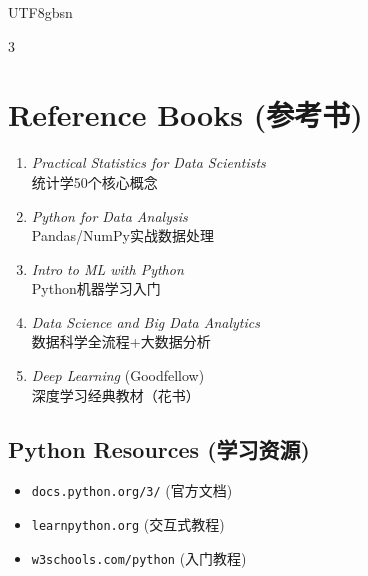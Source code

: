 \documentclass[10pt,landscape,a4paper]{article}
\newcommand{\zhint}[1]{{\scriptsize\color{gray!70!black}#1}}
\begin{document}
\begin{CJK}{UTF8}{gbsn}
\begin{multicols}{3}
\section{Reference Books \zhint{(参考书)}}

\begin{enumerate}[leftmargin=*, nosep, itemsep=2pt]
    \item \textit{Practical Statistics for Data Scientists}\\
    \zhint{统计学50个核心概念}
    \item \textit{Python for Data Analysis}\\
    \zhint{Pandas/NumPy实战数据处理}
    \item \textit{Intro to ML with Python}\\
    \zhint{Python机器学习入门}
    \item \textit{Data Science and Big Data Analytics}\\
    \zhint{数据科学全流程+大数据分析}
    \item \textit{Deep Learning} (Goodfellow)\\
    \zhint{深度学习经典教材（花书）}
\end{enumerate}

\subsection{Python Resources \zhint{(学习资源)}}
\begin{itemize}[leftmargin=*, nosep, itemsep=0pt]
    \item \texttt{docs.python.org/3/} \zhint{(官方文档)}
    \item \texttt{learnpython.org} \zhint{(交互式教程)}
    \item \texttt{w3schools.com/python} \zhint{(入门教程)}
\end{itemize}

\end{multicols}
\end{CJK}
\end{document}
